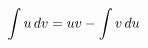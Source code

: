 \documentclass[preview]{standalone}
\begin{document}
\begin{align*}
\special{dvisvgm:raw <g id='unique000'>}\int u \, dv = uv - \int v \, du\special{dvisvgm:raw </g>}
\end{align*}
\end{document}
